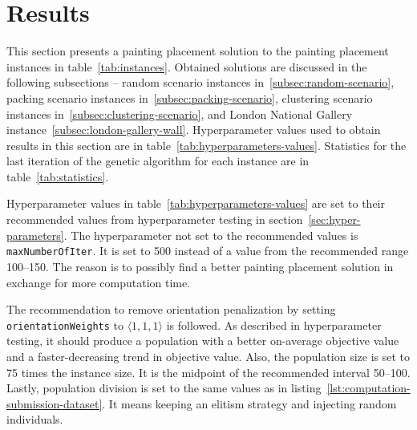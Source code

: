 \clearpage
\newpage


\section{Results}\label{sec:results}
This section presents a painting placement solution to the painting placement instances in table~\ref{tab:instances}.
Obtained solutions are discussed in the following subsections –
random scenario instances in~\ref{subsec:random-scenario},
packing scenario instances in~\ref{subsec:packing-scenario},
clustering scenario instances in~\ref{subsec:clustering-scenario},
and London National Gallery instance~\ref{subsec:london-gallery-wall}.
Hyperparameter values used to obtain results in this section are in table~\ref{tab:hyperparameters-values}.
Statistics for the last iteration of the genetic algorithm for each instance are in table~\ref{tab:statistics}.

Hyperparameter values in table~\ref{tab:hyperparameters-values} are set to their recommended values
from hyperparameter testing in section~\ref{sec:hyper-parameters}.
The hyperparameter not set to the recommended values is \verb|maxNumberOfIter|.
It is set to 500 instead of a value from the recommended range \numrange{100}{150}.
The reason is to possibly find a better painting placement solution in exchange for more computation time.

The recommendation to remove orientation penalization by setting \verb|orientationWeights| to $\langle 1,1,1\rangle$ is followed.
As described in hyperparameter testing, it should produce a population with a better on-average objective value and a faster-decreasing trend in objective value.
Also, the population size is set to 75 times the instance size.
It is the midpoint of the recommended interval \numrange{50}{100}.
Lastly, population division is set to the same values as in listing~\ref{lst:computation-submission-dataset}.
It means keeping an elitism strategy and injecting random individuals.


